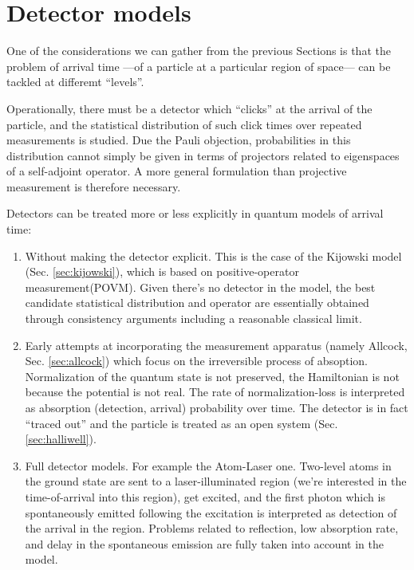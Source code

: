 \section{Detector models}\label{sec:hist:detect}

One of the considerations we can gather from the previous Sections
is that 
the problem of arrival time ---of a particle at a particular region of space---
can be tackled at differemt ``levels''. 

Operationally, there must be a detector which
``clicks'' at the arrival of the particle, and the statistical distribution of
such click times over repeated measurements is studied. Due the Pauli objection,
probabilities in this distribution cannot simply be given in terms of projectors related to eigenspaces of a self-adjoint operator.
A more general formulation than projective measurement is therefore necessary.

Detectors can be treated more or less explicitly in quantum models of arrival time:
\begin{enumerate}
  \item
    Without making the detector explicit. This is the case of the Kijowski model (Sec. \ref{sec:kijowski}),
    which is based on positive-operator measurement\linebreak(POVM). Given there's no detector in the model,
    the best candidate statistical distribution and operator are essentially obtained
    through consistency arguments including a reasonable classical limit.
  \item
    Early attempts at incorporating the measurement apparatus
    (namely Allcock, Sec. \ref{sec:allcock}) which
    focus on the irreversible process of absoption.
    Normalization of the quantum state is not preserved, the Hamiltonian is not
    because the potential is not real. The rate of normalization-loss is interpreted as
    absorption (detection, arrival) probability over time. The detector is in fact
    ``traced out'' and the particle is treated as an open system (Sec. \ref{sec:halliwell}).
  \item
    Full detector models. For example the Atom-Laser one. Two-level atoms in the ground state
    are sent to a laser-illuminated region (we're interested in the time-of-arrival into this region),
    get excited, and the first photon which is spontaneously emitted following the excitation
    is interpreted as detection of the arrival in the region. Problems related to
    reflection, low absorption rate, and delay in the spontaneous emission are fully taken into account in the model.
\end{enumerate}

